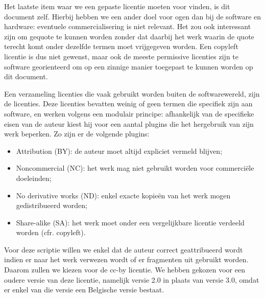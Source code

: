 Het laatste item waar we een gepaste licentie moeten voor vinden, is dit document zelf. Hierbij hebben we een ander doel voor ogen dan bij de software en hardware: eventuele commercialisering is niet relevant. Het zou ook interessant zijn om gequote te kunnen worden zonder dat daarbij het werk waarin de quote terecht komt onder dezelfde termen moet vrijgegeven worden. Een copyleft licentie is dus niet gewenst, maar ook de meeste permissive licenties zijn te software georienteerd om op een zinnige manier toegepast te kunnen worden op dit document.

Een verzameling licenties die vaak gebruikt worden buiten de softwarewereld, zijn de  licenties. Deze licenties bevatten weinig of geen termen die specifiek zijn aan software, en werken volgens een modulair principe: afhankelijk van de specifieke eisen van de auteur kiest hij voor een aantal plugins die het hergebruik van zijn werk beperken. Zo zijn er de volgende plugins:
\begin{itemize}
  \item Attribution (BY): de auteur moet altijd expliciet vermeld blijven;
  \item Noncommercial (NC): het werk mag niet gebruikt worden voor commerciële doeleinden;
  \item No derivative works (ND): enkel exacte kopieën van het werk mogen gedistribueerd worden;
  \item Share-alike (SA): het werk moet onder een vergelijkbare licentie verdeeld worden (cfr. copyleft).
\end{itemize}

Voor deze scriptie willen we enkel dat de auteur correct geattribueerd wordt indien er naar het werk verwezen wordt of er fragmenten uit gebruikt worden. Daarom zullen we kiezen voor de \ac{cc-by} licentie. We hebben gekozen voor een oudere versie van deze licentie, namelijk versie 2.0 in plaats van versie 3.0, omdat er enkel van die versie een Belgische versie bestaat.
